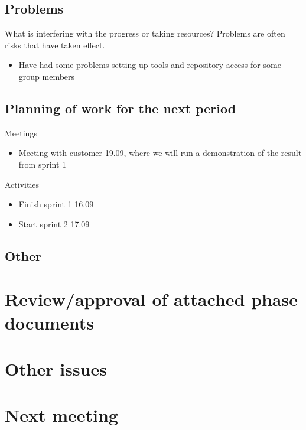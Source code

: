 \documentclass[a4paper,12pt]{article}
\begin{document}
\subsection{Problems}
What is interfering with the progress or taking resources? Problems are often risks that have taken effect.
\begin{itemize}
\item
Have had some problems setting up tools and repository access for some group members
\end{itemize}
\subsection{Planning of work for the next period}
Meetings
\begin{itemize}
\item
Meeting with customer 19.09, where we will run a demonstration of the result from sprint 1
\end{itemize}
Activities
\begin{itemize}
\item
Finish sprint 1 16.09
\item
Start sprint 2 17.09
\end{itemize}
\subsection{Other}
\section{Review/approval of attached phase documents}
\section{Other issues}
\section{Next meeting}
\end{document}
